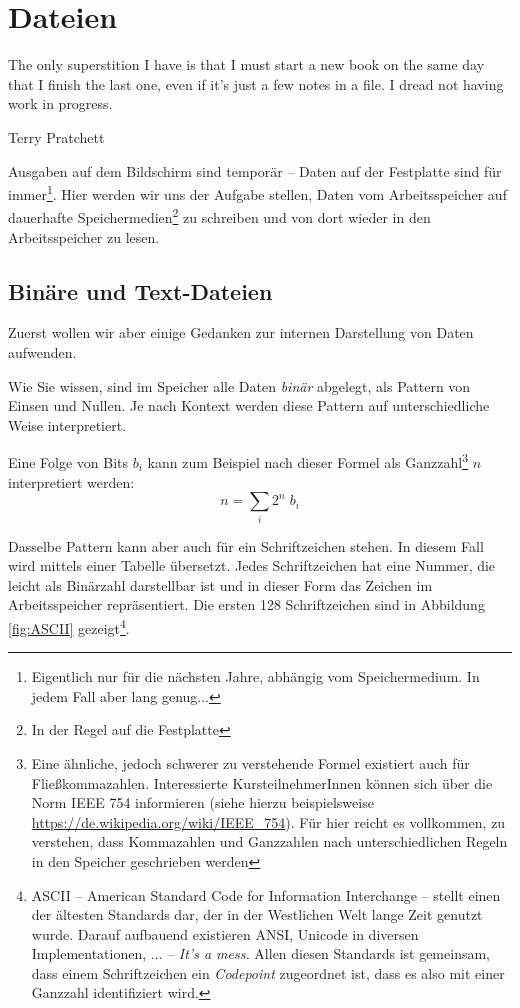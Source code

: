 \chapter{Dateien}
\label{chp:Files}
\epigraph{
	The only superstition I have is that I must start a new book on the same day that I finish the last one, even if it's just a few notes in a file. I dread not having work in progress.
}{Terry Pratchett}

Ausgaben auf dem Bildschirm sind temporär -- Daten auf der Festplatte sind für immer\footnote{Eigentlich nur für die nächsten Jahre, abhängig vom Speichermedium. In jedem Fall aber lang genug...}. Hier werden wir uns der Aufgabe stellen, Daten vom Arbeitsspeicher auf dauerhafte Speichermedien\footnote{In der Regel auf die Festplatte} zu schreiben und von dort wieder in den Arbeitsspeicher zu lesen.

\section{Binäre und Text-Dateien}
Zuerst wollen wir aber einige Gedanken zur internen Darstellung von Daten aufwenden.

Wie Sie wissen, sind im Speicher alle Daten \emph{binär} abgelegt, \ie als Pattern von Einsen und Nullen. Je nach Kontext werden diese Pattern auf unterschiedliche Weise interpretiert.

Eine Folge von Bits $b_i$ kann zum Beispiel nach dieser Formel als Ganzzahl\footnote{Eine ähnliche, jedoch schwerer zu verstehende Formel existiert auch für Fließkommazahlen. Interessierte KursteilnehmerInnen können sich über die Norm IEEE 754 informieren (siehe hierzu beispielsweise \url{https://de.wikipedia.org/wiki/IEEE_754}). Für hier reicht es vollkommen, zu verstehen, dass Kommazahlen und Ganzzahlen nach unterschiedlichen Regeln in den Speicher geschrieben werden} $n$ interpretiert werden:
\begin{equation*}
	n = \sum_{i} 2^n \; b_i
\end{equation*}

Dasselbe Pattern kann aber auch für ein Schriftzeichen stehen. In diesem Fall wird mittels einer Tabelle übersetzt. Jedes Schriftzeichen hat eine Nummer, die leicht als Binärzahl darstellbar ist und in dieser Form das Zeichen im Arbeitsspeicher repräsentiert. Die ersten 128 Schriftzeichen sind in Abbildung \ref{fig:ASCII} gezeigt\footnote{ASCII -- American Standard Code for Information Interchange -- stellt einen der ältesten Standards dar, der in der Westlichen Welt lange Zeit genutzt wurde. Darauf aufbauend existieren ANSI, Unicode in diversen Implementationen, ... -- \emph{It's a mess.} Allen diesen Standards ist gemeinsam, dass einem Schriftzeichen ein \emph{Codepoint} zugeordnet ist, dass es also mit einer Ganzzahl identifiziert wird.}.

